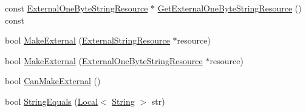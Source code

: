 \begin{DoxyCompactItemize}
\item 
const \mbox{\hyperlink{classv8_1_1String_1_1ExternalOneByteStringResource}{External\+One\+Byte\+String\+Resource}} $\ast$ \mbox{\hyperlink{classv8_1_1String_af93d92ca10a216be472d1b7c20550f76}{Get\+External\+One\+Byte\+String\+Resource}} () const
\item 
bool \mbox{\hyperlink{classv8_1_1String_a5efd1eba40c1fa8a6aae2c4a175a63be}{Make\+External}} (\mbox{\hyperlink{classv8_1_1String_1_1ExternalStringResource}{External\+String\+Resource}} $\ast$resource)
\item 
bool \mbox{\hyperlink{classv8_1_1String_a607d632c720eec5133649f522aefa944}{Make\+External}} (\mbox{\hyperlink{classv8_1_1String_1_1ExternalOneByteStringResource}{External\+One\+Byte\+String\+Resource}} $\ast$resource)
\item 
bool \mbox{\hyperlink{classv8_1_1String_a0fe076838af046506ffebbfadcde812a}{Can\+Make\+External}} ()
\item 
bool \mbox{\hyperlink{classv8_1_1String_aaca2109ba1c2c50e45d40d7b79edb01c}{String\+Equals}} (\mbox{\hyperlink{classv8_1_1Local}{Local}}$<$ \mbox{\hyperlink{classv8_1_1String}{String}} $>$ str)
\end{DoxyCompactItemize}
